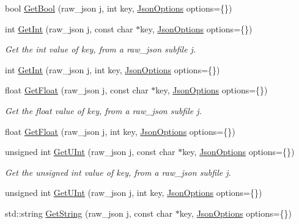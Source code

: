 \begin{DoxyCompactItemize}
bool \hyperlink{classTarbora_1_1Json_a9767d7711293215321d6e962ecd69654}{Get\+Bool} (raw\+\_\+json j, int key, \hyperlink{structTarbora_1_1JsonOptions}{Json\+Options} options=\{\})
\item 
int \hyperlink{classTarbora_1_1Json_ac912f15cc268d126884c5a192bf6021c}{Get\+Int} (raw\+\_\+json j, const char $\ast$key, \hyperlink{structTarbora_1_1JsonOptions}{Json\+Options} options=\{\})
\begin{DoxyCompactList}\small\item\em Get the int value of {\itshape key}, from a raw\+\_\+json subfile {\itshape j}. \end{DoxyCompactList}\item 
int \hyperlink{classTarbora_1_1Json_a349f912bf869a053bf9aff26ee76128b}{Get\+Int} (raw\+\_\+json j, int key, \hyperlink{structTarbora_1_1JsonOptions}{Json\+Options} options=\{\})
\item 
float \hyperlink{classTarbora_1_1Json_afe9349b6e3a14cca1c2e7aee6162ffca}{Get\+Float} (raw\+\_\+json j, const char $\ast$key, \hyperlink{structTarbora_1_1JsonOptions}{Json\+Options} options=\{\})
\begin{DoxyCompactList}\small\item\em Get the float value of {\itshape key}, from a raw\+\_\+json subfile {\itshape j}. \end{DoxyCompactList}\item 
float \hyperlink{classTarbora_1_1Json_ac326e0735a6a1cc0afa0eb43e9872179}{Get\+Float} (raw\+\_\+json j, int key, \hyperlink{structTarbora_1_1JsonOptions}{Json\+Options} options=\{\})
\item 
unsigned int \hyperlink{classTarbora_1_1Json_a7a4f2fd643369df0750e951db42499e3}{Get\+U\+Int} (raw\+\_\+json j, const char $\ast$key, \hyperlink{structTarbora_1_1JsonOptions}{Json\+Options} options=\{\})
\begin{DoxyCompactList}\small\item\em Get the unsigned int value of {\itshape key}, from a raw\+\_\+json subfile {\itshape j}. \end{DoxyCompactList}\item 
unsigned int \hyperlink{classTarbora_1_1Json_a3bf386f07b8648fb7d55b22712df5cb3}{Get\+U\+Int} (raw\+\_\+json j, int key, \hyperlink{structTarbora_1_1JsonOptions}{Json\+Options} options=\{\})
\item 
std\+::string \hyperlink{classTarbora_1_1Json_ad8bd8296d4c402db6d6607ade20652c7}{Get\+String} (raw\+\_\+json j, const char $\ast$key, \hyperlink{structTarbora_1_1JsonOptions}{Json\+Options} options=\{\})

\end{DoxyCompactItemize}
